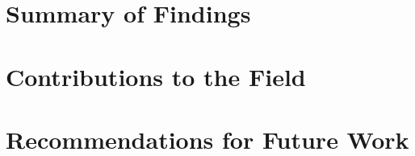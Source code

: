 \section{Summary of Findings}

\section{Contributions to the Field}

\section{Recommendations for Future Work}